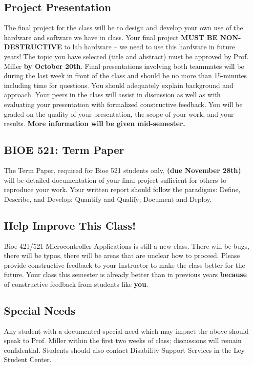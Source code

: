 \documentclass[10pt]{article}
\def\projectOutlineDue{October 20th} %
\def\termPaperDue{November 28th} %
\begin{document}
\subsection*{Project Presentation}
The final project for the class will be to design and develop your own use of the hardware and software we have in class. Your final project \textbf{MUST BE NON-DESTRUCTIVE} to lab hardware -- we need to use this hardware in future years! The topic you have selected (title and abstract) must be approved by Prof. Miller \textbf{by \projectOutlineDue}. Final presentations involving both teammates will be during the last week in front of the class and should be no more than 15-minutes including time for questions. You should adequately explain background and approach. Your peers in the class will assist in discussion as well as with evaluating your presentation with formalized constructive feedback. You will be graded on the quality of your presentation, the scope of your work, and your results. \textbf{More information will be given mid-semester.} 

\subsection*{BIOE 521: Term Paper}
The Term Paper, required for Bioe 521 students only, \textbf{(due \termPaperDue)} will be detailed documentation of your final project sufficient for others to reproduce your work. Your written report should follow the paradigms: Define, Describe, and Develop; Quantify and Qualify; Document and Deploy.


\subsection*{Help Improve This Class!}
Bioe 421/521 Microcontroller Applications is still a new class. There will be bugs, there will be typos, there will be areas that are unclear how to proceed. Please provide constructive feedback to your Instructor to make the class better for the future. Your class this semester is already better than in previous years \textbf{because} of constructive feedback from students like \textbf{you}.


\subsection*{Special Needs}
Any student with a documented special need which may impact the above should speak to Prof. Miller within the first two weeks of class; discussions will remain confidential. Students should also contact Disability Support Services in the Ley Student Center.
\end{document}
